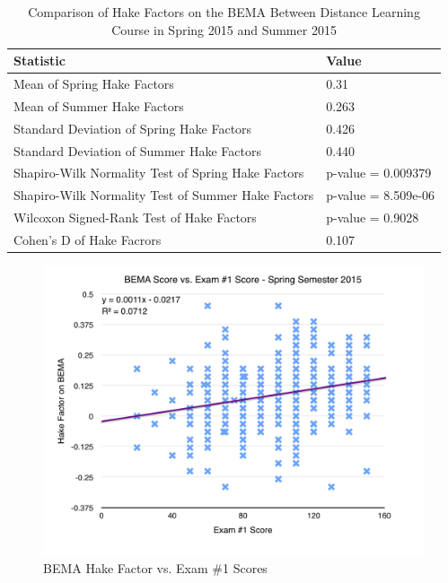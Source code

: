 \pagebreak\clearpage

\begin{small}
\begin{table}
  \centering
  \begin{tabular}{|l|l|}
    \hline
    \textbf{Statistic} & \textbf{Value} \\
	\hline
	Mean of Spring Hake Factors & 0.31 \\
	\hline
	Mean of Summer Hake Factors & 0.263 \\
	\hline
	Standard Deviation of Spring Hake Factors & 0.426 \\
	\hline
	Standard Deviation of Summer Hake Factors & 0.440 \\
	\hline
	Shapiro-Wilk Normality Test of Spring Hake Factors & p-value = 0.009379 \\
	\hline
	Shapiro-Wilk Normality Test of Summer Hake Factors & p-value = 8.509e-06 \\
	\hline
	Wilcoxon Signed-Rank Test of Hake Factors & p-value = 0.9028 \\
	\hline
	Cohen's D of Hake Facrors & 0.107 \\
	\hline
  \end{tabular}
	\caption[Comparison of Hake Factors on the BEMA Between Distance Learning Course in Spring 2015 and Summer 2015]{Comparison of Hake Factors on the BEMA Between Distance Learning Course in Spring 2015 and Summer 2015}
  \label{tab:hakeSp15dSu15}
\end{table}
\end{small}

\pagebreak\clearpage

\begin{figure}
	\centering
	\includegraphics[width=5in]{img/chapter4/bema_vs_ex1_sp15}
	\caption[BEMA Hake Factor vs. Exam \#1 Scores]{BEMA Hake Factor vs. Exam \#1 Scores}
  \label{fig:bemaVsExOneSp15}
\end{figure}

